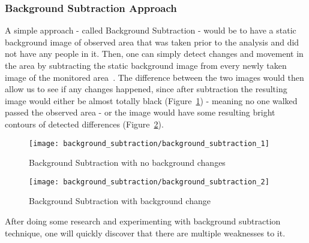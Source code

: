 	\subsubsection{Background Subtraction Approach}
	A simple approach - called Background Subtraction - would be to have a static background image of observed area that was taken prior to the analysis and did not have any people in it. Then, one can simply detect changes and movement in the area by subtracting the static background image from every newly taken image of the monitored area~\cite{background_subtraction_1}. The difference between the two images would then allow us to see if any changes happened, since after subtraction the resulting image would either be almost totally black (Figure~\ref{fig:background_subtraction_1}) - meaning no one walked passed the observed area - or the image would have some resulting bright contours of detected differences (Figure~\ref{fig:background_subtraction_2}).
	\begin{figure}[ht]
		\centering
		\texttt{[image: background\_subtraction/background\_subtraction\_1]}
		\caption{Background Subtraction with no background changes}
		\label{fig:background_subtraction_1}
	\end{figure}
	\begin{figure}[ht]
		\centering
		\texttt{[image: background\_subtraction/background\_subtraction\_2]}
		\caption{Background Subtraction with background change}
		\label{fig:background_subtraction_2}
	\end{figure}
	
	After doing some research and experimenting with background subtraction technique, one will quickly discover that there are multiple weaknesses to it. 
	
